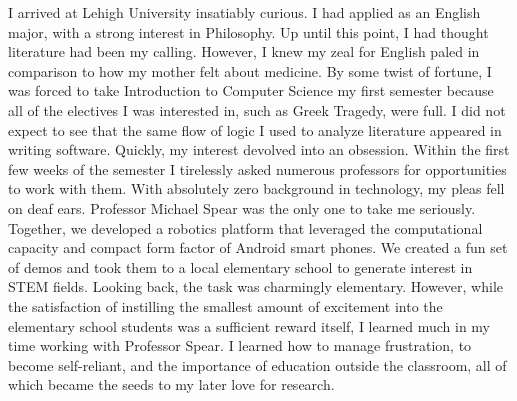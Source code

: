 \documentclass[12pt]{article}
\begin{document}
I arrived at Lehigh University insatiably curious. I had applied as an English
major, with a strong interest in Philosophy.  Up until this point, I had
thought literature had been my calling. However, I knew my zeal for English
paled in comparison to how my mother felt about medicine. By some twist of
fortune, I was forced to take Introduction to Computer Science my first
semester because all of the electives I was interested in, such as Greek
Tragedy, were full. I did not expect to see that the same flow of logic I used
to analyze literature appeared in writing software. Quickly, my interest
devolved into an obsession.  Within the first few weeks of the semester I
tirelessly asked numerous professors for opportunities to work with them.  With
absolutely zero background in technology, my pleas fell on deaf ears.
Professor Michael Spear was the only one to take me seriously. Together, we
developed a robotics platform that leveraged the computational capacity and
compact form factor of Android smart phones. We created a fun set of demos and
took them to a local elementary school to generate interest in STEM fields.
Looking back, the task was charmingly elementary. However, while the
satisfaction of instilling the smallest amount of excitement into the
elementary school students was a sufficient reward itself, I learned much in my
time working with Professor Spear.  I learned how to manage frustration, to
become self-reliant, and the importance of education outside the classroom, all
of which became the seeds to my later love for research.
\end{document}
